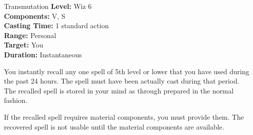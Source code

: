 {Transmutation}
{
	\textbf{Level:}
	Wiz 6\\
	\textbf{Components:}
	V, S\\
	\textbf{Casting Time:}
	1 standard action\\
	\textbf{Range:}
	Personal\\
	\textbf{Target:}
	You\\
	\textbf{Duration:}
	Instantaneous\\
}
{
	You instantly recall any one spell of 5th level or lower that you have used during the past 24 hours. The spell must have been actually cast during that period. The recalled spell is stored in your mind as through prepared in the normal fashion.

	If the recalled spell requires material components, you must provide them. The recovered spell is not usable until the material components are available.

}
